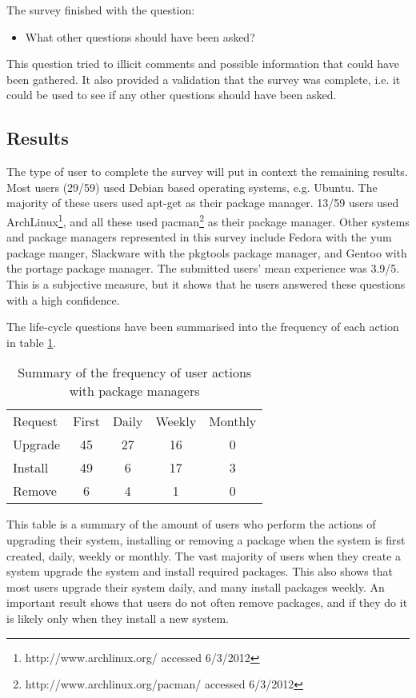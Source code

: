 The survey finished with the question:
\begin{itemize}
  \item What other questions should have been asked?
\end{itemize}
This question tried to illicit comments and possible information that could have been gathered.
It also provided a validation that the survey was complete, i.e. it could be used to see if any other questions should have been asked.

\subsection{Results}
The type of user to complete the survey will put in context the remaining results.
Most users (29/59) used Debian based operating systems, e.g. Ubuntu.
The majority of these users used apt-get as their package manager.
13/59  users used ArchLinux\footnote{http://www.archlinux.org/ accessed 6/3/2012},
and all these used pacman\footnote{http://www.archlinux.org/pacman/ accessed 6/3/2012} as their package manager.
Other systems and package managers represented in this survey include Fedora with the yum package manger,
Slackware with the pkgtools package manager, and Gentoo with the portage package manager.
The submitted users' mean experience was 3.9/5.
This is a subjective measure, but it shows that he users answered these questions with a high confidence. 

The life-cycle questions have been summarised into the frequency of each action in table \ref{strat.tblaction}.
\begin{table}[htp]
\begin{tabular}{l | c | c | c | c |}
Request & First & Daily & Weekly & Monthly \\
Upgrade  & 45 & 27 & 16 & 0 \\
Install & 49 & 6 & 17 & 3 \\
Remove & 6 & 4 & 1 & 0\\
\end{tabular}
\caption{Summary of the frequency of user actions with package managers}
\label{strat.tblaction}
\end{table}

This table is a summary of the amount of users who perform the actions of upgrading their system, installing or removing a package 
when the system is first created, daily, weekly or monthly.
The vast majority of users when they create a system upgrade the system and install required packages.
This also shows that most users upgrade their system daily, and many install packages weekly.
An important result shows that users do not often remove packages, and if they do it is likely only when they install a new system.

